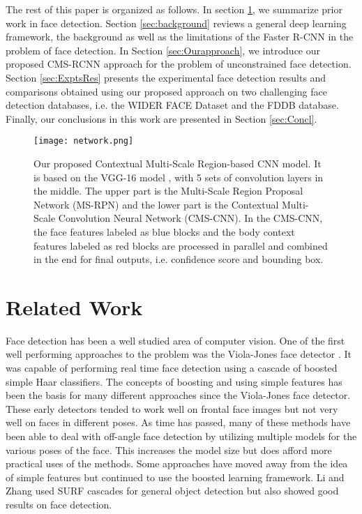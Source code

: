 \documentclass[10pt,journal,cspaper,compsoc]{IEEEtran}
\begin{document}
The rest of this paper is organized as follows. In section \ref{sec:related}, we summarize prior work in face detection. Section \ref{sec:background} reviews a general deep learning framework, the background as well as the limitations of the Faster R-CNN in the problem of face detection. In Section \ref{sec:Ourapproach}, we introduce our proposed CMS-RCNN approach for the problem of unconstrained face detection. Section \ref{sec:ExptsRes} presents the experimental face detection results and comparisons obtained using our proposed approach on two challenging face detection databases, i.e. the WIDER FACE Dataset and the FDDB database. Finally, our conclusions in this work are presented in Section \ref{sec:Concl}.

\begin{figure}
\centering
\texttt{[image: network.png]}
\caption{Our proposed Contextual Multi-Scale Region-based CNN model. It is based on the VGG-16 model \cite{simonyan2014very}, with 5 sets of convolution layers in the middle. The upper part is the Multi-Scale Region Proposal Network (MS-RPN) and the lower part is the Contextual Multi-Scale Convolution Neural Network (CMS-CNN). In the CMS-CNN, the face features labeled as blue blocks and the body context features labeled as red blocks are processed in parallel and combined in the end for final outputs, i.e. confidence score and bounding box.}
\label{fig:msfrcnn_fw}
\end{figure}




\section{Related Work}
\label{sec:related}





Face detection has been a well studied area of computer vision. One of the first well performing approaches to the problem was the Viola-Jones face detector \cite{viola2001rapid}. It was capable of performing real time face detection using a cascade of boosted simple Haar classifiers. The concepts of boosting and using simple features has been the basis for many different approaches \cite{zhang2010survey} since the Viola-Jones face detector. These early detectors tended to work well on frontal face images but not very well on faces in different poses. As time has passed, many of these methods have been able to deal with off-angle face detection by utilizing multiple models for the various poses of the face. This increases the model size but does afford more practical uses of the methods. Some approaches have moved away from the idea of simple features but continued to use the boosted learning framework. Li and Zhang \cite{li2013learning} used SURF cascades for general object detection but also showed good results on face detection.
\end{document}
